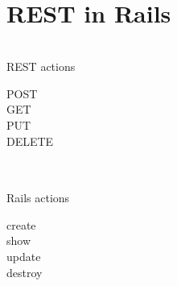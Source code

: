 \section{REST in Rails}




\begin{frame}
  \frametitle{\insertsection}
  \begin{columns}
    \begin{column}{3cm}
      \begin{center}REST actions\\\end{center}
        POST\\
        GET\\
        PUT\\
        DELETE
    \end{column}
  \end{columns}
\end{frame}

\begin{frame}
  \frametitle{\insertsection}
  \begin{columns}
    \begin{column}{3cm}
      \begin{center}Rails actions\\\end{center}
        create\\
        show\\
        update\\
        destroy\\
    \end{column}
  \end{columns}
\end{frame}

